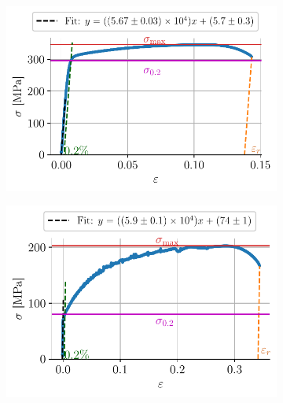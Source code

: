\begin{figure}[h!]
    \centering
    \begin{subfigure}{0.48\linewidth}
        \centering
        \includegraphics[width=\linewidth]{figures/froid2all.pdf}
        \caption{}
        \label{fig:froid2}
    \end{subfigure}
    \begin{subfigure}{0.48\linewidth}
        \centering
        \includegraphics[width=\linewidth]{figures/chaud3all.pdf}
        \caption{}
        \label{fig:chaud3}
    \end{subfigure}
    \begin{subfigure}{0.48\linewidth}
        \centering

\end{subfigure}
\end{figure}
